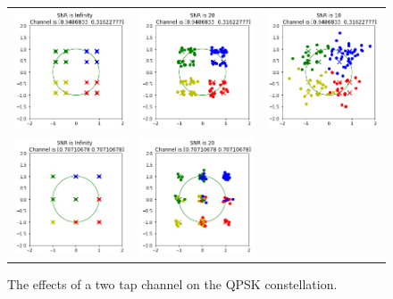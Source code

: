 \setlength{\tabcolsep}{0pt}
\begin{figure}
  \centering
  \caption{The effects of a two tap channel on the QPSK constellation.}
  \begin{tabular}{ccc}
    \includegraphics[width=45mm]{figures/equal_intro/snr_0_c3/cfo_0.png}&
    \includegraphics[width=45mm]{figures/equal_intro/snr_20_c3/cfo_0.png}&
    \includegraphics[width=45mm]{figures/equal_intro/snr_10_c3/cfo_0.png}\\
    \includegraphics[width=45mm]{figures/equal_intro/snr_0_c2/cfo_0.png}&
    \includegraphics[width=45mm]{figures/equal_intro/snr_20_c2/cfo_0.png}&

\end{tabular}
\end{figure}
